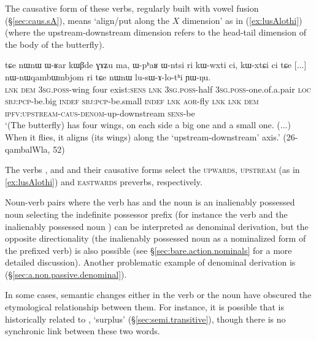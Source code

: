 The causative form of these verbs, regularly built with vowel fusion   (§\ref{sec:caus.sA}), means `align/put along the $X$ dimension' as in (\ref{ex:lusAlothi}) (where the upstream-downstream dimension refers to the head-tail dimension of the body of the butterfly).

\begin{exe}
\ex \label{ex:lusAlothi}
\gll tɕe nɯnɯ ɯ-ʁar kɯβde ɣɤʑu ma, ɯ-pʰaʁ ɯ-ntsi ri kɯ-wxti ci, kɯ-xtɕi ci tɕe [...] nɯ-nɯqambɯmbjom ri tɕe nɯnɯ lu-sɯ-ɤ-lo-tʰi ɲɯ-ŋu. \\
\textsc{lnk} \textsc{dem} \textsc{3sg}.\textsc{poss}-wing four exist:\textsc{sens} \textsc{lnk} \textsc{3sg}.\textsc{poss}-half \textsc{3sg}.\textsc{poss}-one.of.a.pair \textsc{loc} \textsc{sbj}:\textsc{pcp}-be.big \textsc{indef} \textsc{sbj}:\textsc{pcp}-be.small \textsc{indef} \textsc{lnk} { }  \textsc{aor}-fly \textsc{lnk} \textsc{lnk} \textsc{dem} \textsc{ipfv}:\textsc{upstream}-\textsc{caus}-\textsc{denom}-up-downstream \textsc{sens}-be \\
\glt `(The butterfly) has four wings, on each side a big one and a small one. (...) When it flies, it aligns (its wings) along the `upstream-downstream' axis.' (26-qambalWla, 52)
\end{exe}

The verbs ,  and  and their causative forms  select the \textsc{upwards}, \textsc{upstream} (as in \ref{ex:lusAlothi}) and \textsc{eastwards} preverbs, respectively.


Noun-verb pairs where the verb has  and the noun is an inalienably possessed noun selecting the  indefinite possessor prefix (for instance the verb  and the inalienably possessed noun  ) can be interpreted as  denominal derivation, but the opposite directionality (the inalienably possessed noun as a nominalized form of the  prefixed verb) is also possible (see §\ref{sec:bare.action.nominals} for a more detailed discussion). Another problematic example of  denominal derivation is  (§\ref{sec:a.non.passive.denominal}).

In some cases, semantic changes either in the verb or the noun have obscured the etymological relationship between them. For instance, it is possible that  is historically related to , `surplus' (§\ref{sec:semi.transitive}), though there is no synchronic link between these two words.
 
